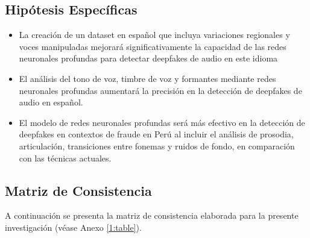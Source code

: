 \subsection{Hipótesis Específicas}
\newcommand{\Hone}{
La creación de un dataset en español que incluya variaciones regionales y voces manipuladas mejorará significativamente la capacidad de las redes neuronales profundas para detectar deepfakes de audio en este idioma
}
\newcommand{\Htwo}{
El análisis del tono de voz, timbre de voz y formantes mediante redes neuronales profundas aumentará la precisión en la detección de deepfakes de audio en español.
}
\newcommand{\Hthree}{
El modelo de redes neuronales profundas será más efectivo en la detección de deepfakes en contextos de fraude en Perú al incluir el análisis de prosodia, articulación, transiciones entre fonemas y ruidos de fondo, en comparación con las técnicas actuales.	
}

\begin{itemize}
	\item \Hone
	\item \Htwo
	\item \Hthree
\end{itemize}

\subsection{Matriz de Consistencia}
A continuación se presenta la matriz de consistencia elaborada para la presente investigación (véase Anexo \ref{1:table}).

